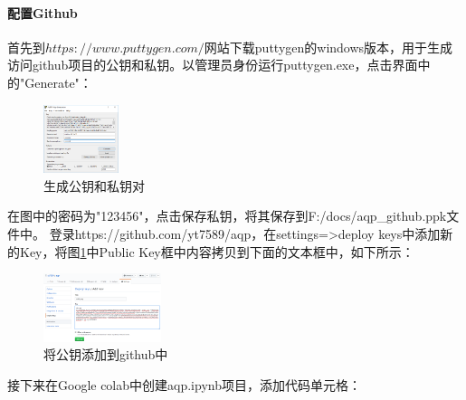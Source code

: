 \documentclass{article}
\begin{document}
\paragraph{配置Github}
首先到$https://www.puttygen.com/$网站下载puttygen的windows版本，用于生成访问github项目的公钥和私钥。以管理员身份运行puttygen.exe，点击界面中的"Generate"：
\begin{figure}[H]
	\caption{生成公钥和私钥对}
	\label{f000040}
	\centering
	\includegraphics[height=2cm]{images/f000040}
\end{figure}
在图中的密码为"123456"，点击保存私钥，将其保存到F:/docs/aqp\_github.ppk文件中。\newline
登录https://github.com/yt7589/aqp，在settings=>deploy keys中添加新的Key，将图\ref{f000040}中Public Key框中内容拷贝到下面的文本框中，如下所示：
\begin{figure}[H]
	\caption{将公钥添加到github中}
	\label{f000041}
	\centering
	\includegraphics[height=2cm]{images/f000041}
\end{figure}
接下来在Google colab中创建aqp.ipynb项目，添加代码单元格：
\end{document}
